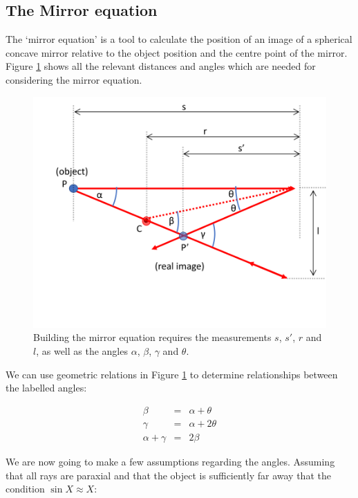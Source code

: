 \documentclass[
]{book}
\begin{document}
\hypertarget{sec:ch15-mirrorequ}{%
\subsection{The Mirror equation}\label{sec:ch15-mirrorequ}}

The `mirror equation' is a tool to calculate the position of an image of a spherical concave mirror relative to the object position and the centre point of the mirror. Figure \ref{fig:ch15-concavesphericalmirroreq1} shows all the relevant distances and angles which are needed for considering the mirror equation.

\begin{figure}

{\centering \includegraphics[width=0.7\linewidth]{visualisations/LaTeX/ch15-mirrorequation} 

}

\caption{Building the mirror equation requires the measurements $s$, $s'$, $r$ and $l$, as well as the angles $\alpha$, $\beta$, $\gamma$ and $\theta$.}\label{fig:ch15-concavesphericalmirroreq1}
\end{figure}

We can use geometric relations in Figure \ref{fig:ch15-concavesphericalmirroreq1} to determine relationships between the labelled angles:

\begin{equation}
\begin{array}{rcl}
\beta &=& \alpha + \theta \\
\gamma &=& \alpha + 2\theta \\
\alpha + \gamma &=& 2\beta
\end{array}
\end{equation}

We are now going to make a few assumptions regarding the angles. Assuming that all rays are paraxial and that the object is sufficiently far away that the condition \(\sin X \approx X\):
\end{document}
